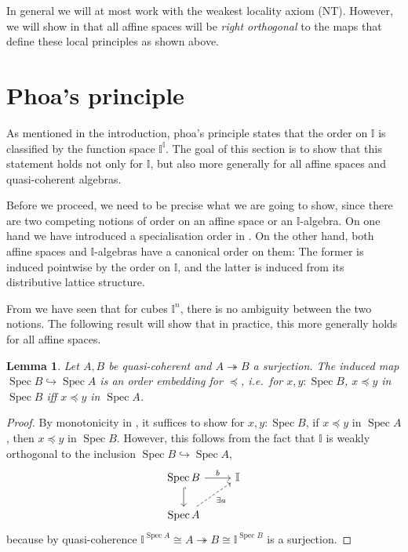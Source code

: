 \documentclass[12pt]{amsart}
\newtheorem{lemma}[theorem]{Lemma}
\theoremstyle{definition}
\newcommand{\mbb}[1]{\mathbb{#1}}
\newcommand{\I}{\mbb I}
\newcommand{\surj}{\twoheadrightarrow}
\newcommand{\hook}{\hookrightarrow}
\newcommand{\spec}{\operatorname{Spec}}
\begin{document}
In general we will at most work with the weakest locality axiom (NT). However, we will show in  that all affine spaces will be \emph{right orthogonal} to the maps that define these local principles as shown above.


\section{Phoa's principle}\label{sec:intposet}

As mentioned in the introduction, phoa's principle states that the order on $\I$ is classified by the function space $\I^\I$. The goal of this section is to show that this statement holds not only for $\I$, but also more generally for all affine spaces and quasi-coherent algebras.

Before we proceed, we need to be precise what we are going to show, since there are two competing notions of order on an affine space or an $\I$-algebra. On one hand we have introduced a specialisation order in . On the other hand, both affine spaces and $\I$-algebras have a canonical order on them: The former is induced pointwise by the order on $\I$, and the latter is induced from its distributive lattice structure. 

From  we have seen that for cubes $\I^n$, there is no ambiguity between the two notions. The following result will show that in practice, this more generally holds for all affine spaces.

\begin{lemma}\label{lem:orderonaffine}
  Let $A,B$ be quasi-coherent and $A \surj B$ a surjection. The induced map $\spec B \hook \spec A$ is an order embedding for $\preceq$, i.e.\ for $x,y : \spec B$, $x \preceq y$ in $\spec B$ iff $x \preceq y$ in $\spec A$.
\end{lemma}
\begin{proof}
  By monotonicity in , it suffices to show for $x,y : \spec B$, if $x \preceq y$ in $\spec A$, then $x \preceq y$ in $\spec B$. However, this follows from the fact that $\I$ is weakly orthogonal to the inclusion $\spec B \hook \spec A$,
  \[
  \begin{tikzcd}
    \spec B \ar[d, hook] \ar[r, "b"] & \I \\ 
    \spec A \ar[ur, dashed, "\exists a"'] 
  \end{tikzcd}
  \]
  because by quasi-coherence $\I^{\spec A} \cong A \surj B \cong \I^{\spec B}$ is a surjection. 
\end{proof}
\end{document}
